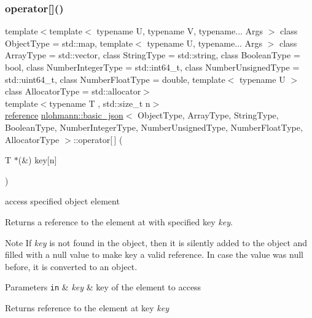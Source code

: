 \subsubsection{\texorpdfstring{operator[]()}{operator[]()}\hspace{0.1cm}{\footnotesize\ttfamily [5/10]}}
{\footnotesize\ttfamily template$<$template$<$ typename U, typename V, typename... Args $>$ class Object\+Type = std\+::map, template$<$ typename U, typename... Args $>$ class Array\+Type = std\+::vector, class String\+Type  = std\+::string, class Boolean\+Type  = bool, class Number\+Integer\+Type  = std\+::int64\+\_\+t, class Number\+Unsigned\+Type  = std\+::uint64\+\_\+t, class Number\+Float\+Type  = double, template$<$ typename U $>$ class Allocator\+Type = std\+::allocator$>$ \\
template$<$typename T , std\+::size\+\_\+t n$>$ \\
\hyperlink{classnlohmann_1_1basic__json_a3ec8e17be8732fe436e9d6733f52b7a3}{reference} \hyperlink{classnlohmann_1_1basic__json}{nlohmann\+::basic\+\_\+json}$<$ Object\+Type, Array\+Type, String\+Type, Boolean\+Type, Number\+Integer\+Type, Number\+Unsigned\+Type, Number\+Float\+Type, Allocator\+Type $>$\+::operator\mbox{[}$\,$\mbox{]} (\begin{DoxyParamCaption}\item[{T $\ast$(\&)}]{key\mbox{[}n\mbox{]} }\end{DoxyParamCaption})\hspace{0.3cm}{\ttfamily [inline]}}



access specified object element 

Returns a reference to the element at with specified key {\itshape key}.

\begin{DoxyNote}{Note}
If {\itshape key} is not found in the object, then it is silently added to the object and filled with a {\ttfamily null} value to make {\ttfamily key} a valid reference. In case the value was {\ttfamily null} before, it is converted to an object.
\end{DoxyNote}

\begin{DoxyParams}[1]{Parameters}
\mbox{\tt in}  & {\em key} & key of the element to access\\
\hline
\end{DoxyParams}
\begin{DoxyReturn}{Returns}
reference to the element at key {\itshape key} 
\end{DoxyReturn}

